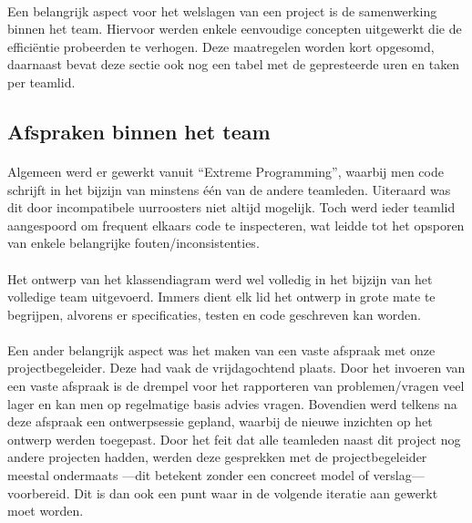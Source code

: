 \label{projectbeheer}
\paragraph{}
Een belangrijk aspect voor het welslagen van een project is de samenwerking binnen het team. Hiervoor werden enkele eenvoudige concepten uitgewerkt die de effici\"entie probeerden te verhogen. Deze maatregelen worden kort opgesomd, daarnaast bevat deze sectie ook nog een tabel met de gepresteerde uren en taken per teamlid.
\subsection{Afspraken binnen het team}
\paragraph{}
Algemeen werd er gewerkt vanuit ``Extreme Programming'', waarbij men code schrijft in het bijzijn van minstens \'e\'en van de andere teamleden. Uiteraard was dit door incompatibele uurroosters niet altijd mogelijk. Toch werd ieder teamlid aangespoord om frequent elkaars code te inspecteren, wat leidde tot het opsporen van enkele belangrijke fouten/inconsistenties.
\paragraph{}
Het ontwerp van het klassendiagram werd wel volledig in het bijzijn van het volledige team uitgevoerd. Immers dient elk lid het ontwerp in grote mate te begrijpen, alvorens er specificaties, testen en code geschreven kan worden.
\paragraph{}
Een ander belangrijk aspect was het maken van een vaste afspraak met onze projectbegeleider. Deze had vaak de vrijdagochtend plaats. Door het invoeren van een vaste afspraak is de drempel voor het rapporteren van problemen/vragen veel lager en kan men op regelmatige basis advies vragen. Bovendien werd telkens na deze afspraak een ontwerpsessie gepland, waarbij de nieuwe inzichten op het ontwerp werden toegepast. Door het feit dat alle teamleden naast dit project nog andere projecten hadden, werden deze gesprekken met de projectbegeleider meestal ondermaats ---dit betekent zonder een concreet model of verslag--- voorbereid. Dit is dan ook een punt waar in de volgende iteratie aan gewerkt moet worden.

